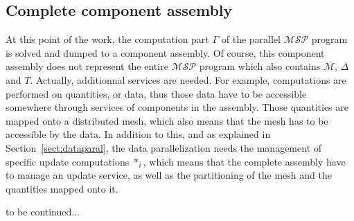 \subsection{Complete component assembly}
At this point of the work, the computation part $\Gamma$ of the parallel $\mathcal{MSP}$ program is solved and dumped to a component assembly. Of course, this component assembly does not represent the entire $\mathcal{MSP}$ program which also contains $\mathcal{M}$, $\Delta$ and $T$. Actually, additionnal services are needed. For example, computations are performed on quantities, or data, thus those data have to be accessible somewhere through services of components in the assembly. Those quantities are mapped onto a distributed mesh, which also means that the mesh has to be accessible by the data. In addition to this, and as explained in Section~\ref{sect:dataparal}, the data parallelization needs the management of specific update computations $*_i$, which means that the complete assembly have to manage an update service, as well as the partitioning of the mesh and the quantities mapped onto it.

to be continued...

